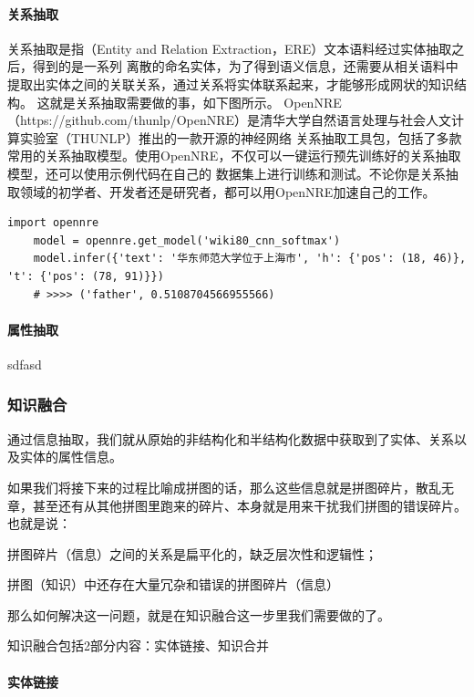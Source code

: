 \documentclass[12pt,a4paper,fancyhdr,openany,oneside]{ctexbook}
\begin{document}
\paragraph{关系抽取}关系抽取是指（Entity and Relation Extraction，ERE）文本语料经过实体抽取之后，得到的是一系列
离散的命名实体，为了得到语义信息，还需要从相关语料中提取出实体之间的关联关系，通过关系将实体联系起来，才能够形成网状的知识结构。
这就是关系抽取需要做的事，如下图所示。
OpenNRE（https://github.com/thunlp/OpenNRE）是清华大学自然语言处理与社会人文计算实验室（THUNLP）推出的一款开源的神经网络
关系抽取工具包，包括了多款常用的关系抽取模型。使用OpenNRE，不仅可以一键运行预先训练好的关系抽取模型，还可以使用示例代码在自己的
数据集上进行训练和测试。不论你是关系抽取领域的初学者、开发者还是研究者，都可以用OpenNRE加速自己的工作。
\begin{lstlisting}[style=Python, caption={ner.py}, label={ner.py}]
    import opennre
    model = opennre.get_model('wiki80_cnn_softmax')
    model.infer({'text': '华东师范大学位于上海市', 'h': {'pos': (18, 46)}, 't': {'pos': (78, 91)}})
    # >>>> ('father', 0.5108704566955566)
\end{lstlisting}

\paragraph{属性抽取}sdfasd




\subsubsection{知识融合}
通过信息抽取，我们就从原始的非结构化和半结构化数据中获取到了实体、关系以及实体的属性信息。

如果我们将接下来的过程比喻成拼图的话，那么这些信息就是拼图碎片，散乱无章，甚至还有从其他拼图里跑来的碎片、本身就是用来干扰我们拼图的错误碎片。
也就是说：

拼图碎片（信息）之间的关系是扁平化的，缺乏层次性和逻辑性；

拼图（知识）中还存在大量冗杂和错误的拼图碎片（信息）

那么如何解决这一问题，就是在知识融合这一步里我们需要做的了。

知识融合包括2部分内容：实体链接、知识合并




\paragraph{实体链接}
\end{document}

